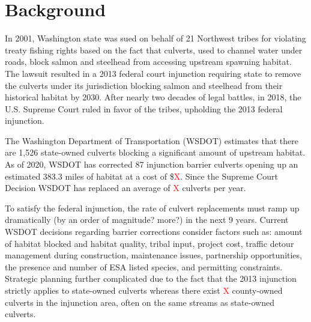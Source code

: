 \documentclass[12pt]{elsarticle}
\begin{document}


\section{Background}


In 2001, Washington state was sued on behalf of 21 Northwest tribes for violating treaty fishing rights based on the fact that culverts, used to channel water under roads, block salmon and steelhead from accessing upstream spawning habitat. The lawsuit resulted in a 2013 federal court injunction requiring state to remove the culverts under its jurisdiction blocking salmon and steelhead from their historical habitat by 2030. After nearly two decades of legal battles, in 2018, the U.S. Supreme Court ruled in favor of the tribes, upholding the 2013 federal injunction. 

The Washington Department of Transportation (WSDOT) estimates that there are 1,526 state-owned culverts blocking a significant amount of upstream habitat. As of 2020, WSDOT has corrected 87 injunction barrier culverts opening up an estimated 383.3 miles of habitat at a cost of \$\textcolor{red}{X}. Since the Supreme Court Decision WSDOT has replaced an average of \textcolor{red}{X} culverts per year. 

To satisfy the federal injunction, the rate of culvert replacements must ramp up dramatically (by an order of magnitude? more?) in the next 9 years. Current WSDOT decisions regarding barrier corrections consider factors such as: amount of habitat blocked and habitat quality, tribal input, project cost, traffic detour management during construction, maintenance issues, partnership opportunities, the presence and number of ESA listed species, and permitting constraints. Strategic planning further complicated due to the fact that the 2013 injunction strictly applies to state-owned culverts whereas there exist \textcolor{red}{X} county-owned culverts in the injunction area, often on the same streams as state-owned culverts.
\end{document}
